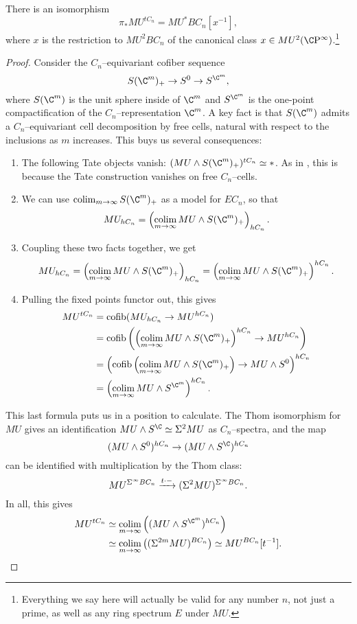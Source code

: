 \begin{theorem}\label{TateConstructionOnMU}
There is an isomorphism \[\pi_* MU^{tC_n} = MU^* BC_n[x^{-1}],\] where \(x\) is the restriction to \(MU^2 BC_n\) of the canonical class \(x \in MU^2(\CP^\infty)\).\footnote{Everything we say here will actually be valid for any number \(n\), not just a prime, as well as any ring spectrum \(E\) under \(MU\).}
\end{theorem}
\begin{proof}
Consider the \(C_n\)--equivariant cofiber sequence \[S(\C^m)_+ \to S^0 \to S^{\C^m},\] where \(S(\C^m)\) is the unit sphere inside of \(\C^m\) and \(S^{\C^m}\) is the one-point compactification of the \(C_n\)--representation \(\C^m\).  A key fact is that \(S(\C^m)\) admits a \(C_n\)--equivariant cell decomposition by free cells, natural with respect to the inclusions as \(m\) increases.  This buys us several consequences:
\begin{enumerate}
    \item The following Tate objects vanish: \((MU \sm S(\C^m)_+)^{tC_n} \simeq *\).  As in , this is because the Tate construction vanishes on free \(C_n\)--cells.
    \item We can use \(\colim_{m \to \infty} S(\C^m)_+\) as a model for \(EC_n\), so that \[MU_{hC_n} = \left( \colim_{m \to \infty} MU \sm S(\C^m)_+ \right)_{hC_n}.\]
    \item Coupling these two facts together, we get \[MU_{hC_n} = \left( \colim_{m \to \infty} MU \sm S(\C^m)_+ \right)_{hC_n} = \left( \colim_{m \to \infty} MU \sm S(\C^m)_+ \right)^{hC_n}.\]
    \item Pulling the fixed points functor out, this gives
    \begin{align*}
    MU^{tC_n} & = \cofib(MU_{hC_n} \to MU^{hC_n}) \\
    & = \cofib\left(\left( \colim_{m \to \infty} MU \sm S(\C^m)_+ \right)^{hC_n} \to MU^{hC_n}\right) \\
    & = \left(\cofib\left( \colim_{m \to \infty} MU \sm S(\C^m)_+ \right) \to MU \sm S^0\right)^{hC_n} \\
    & = \left( \colim_{m \to \infty} MU \sm S^{\C^m} \right)^{hC_n}.
    \end{align*}
\end{enumerate}
This last formula puts us in a position to calculate.  The Thom isomorphism for \(MU\) gives an identification \(MU \sm S^{\C} \simeq \Susp^2 MU\) as \(C_n\)--spectra, and the map \[(MU \sm S^0)^{hC_n} \to (MU \sm S^{\C})^{hC_n}\] can be identified with multiplication by the Thom class: \[MU^{\Sigma^\infty BC_n} \xrightarrow{t \cdot -} (\Sigma^2 MU)^{\Sigma^\infty BC_n}.\]  In all, this gives
\begin{align*}
MU^{tC_n} & \simeq \colim_{m \to \infty} \left((MU \sm S^{\C^m})^{hC_n}\right) \\
& \simeq \colim_{m \to \infty} \left((\Susp^{2m} MU)^{BC_n}\right) \simeq MU^{BC_n}[t^{-1}]. \qedhere
\end{align*}
\end{proof}

